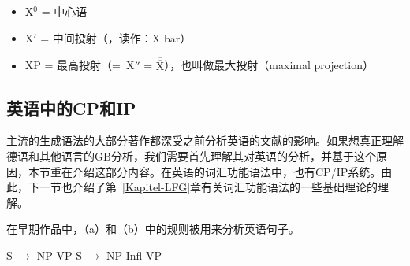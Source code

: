 \begin{itemize}
\item X$^0$ = 中心语
\item X$'$ = 中间投射（\xbar ，读作：X bar）
\item XP = 最高投射（=~X$''$ = $\overline{\overline{\mbox{X}}}$），也叫做最大投射（maximal projection） 
\end{itemize}

\subsection{英语中的CP和IP}
\label{Abschnitt-GB-CP-IP-System-Englisch}\label{sec-GB-CP-IP-System-English}

主流的生成语法的大部分著作都深受之前分析英语的文献的影响。如果想真正理解德语和其他语言的GB分析，我们需要首先理解其对英语的分析，并基于这个原因，本节重在介绍这部分内容。在英语的词汇功能语法中，也有CP/IP系统。由此，下一节也介绍了第~\ref{Kapitel-LFG}章有关词汇功能语法的一些基础理论的理解。

在早期作品中，（a）和（b）中的规则被用来分析英语句子\citep[]{Chomsky81a}。

\eal
\ex S $\to$ NP VP
\ex S $\to$ NP Infl VP
\zl

